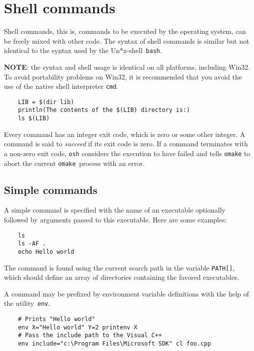 %
\chapter{Shell commands}
\label{chapter:shell}

Shell commands, this is, commands to be executed by the operating system, can be freely mixed with
other code.  The syntax of shell commands is similar but not identical to the syntax used by the
Un*x-shell~\verb+bash+.

\textbf{NOTE}: the syntax and shell usage is identical on all platforms, including Win32.  To avoid
portability problems on Win32, it is recommended that you avoid the use of the native shell
interpreter \verb+cmd+.

\begin{verbatim}
    LIB = $(dir lib)
    println(The contents of the $(LIB) directory is:)
    ls $(LIB)
\end{verbatim}

Every command has an integer exit code, which is zero or some other integer.  A command is said to
\emph{succeed} if its exit code is zero.  If a command terminates with a non-zero exit code,
\verb+osh+ considers the execution to have failed and tells \verb+omake+ to abort the current
\verb+omake+~process with an error.

\section{Simple commands}

A simple command is specified with the name of an executable optionally followed by arguments passed
to this executable.  Here are some examples:

\begin{verbatim}
    ls
    ls -AF .
    echo Hello world
\end{verbatim}

The command is found using the current search path in the variable \verb+PATH[]+, which should
define an array of directories containing the favored executables.

A command may be prefixed by environment variable definitions with the help of the
utility~\verb+env+.

\begin{verbatim}
    # Prints "Hello world"
    env X="Hello world" Y=2 printenv X
    # Pass the include path to the Visual C++
    env include="c:\Program Files\Microsoft SDK" cl foo.cpp
\end{verbatim}

